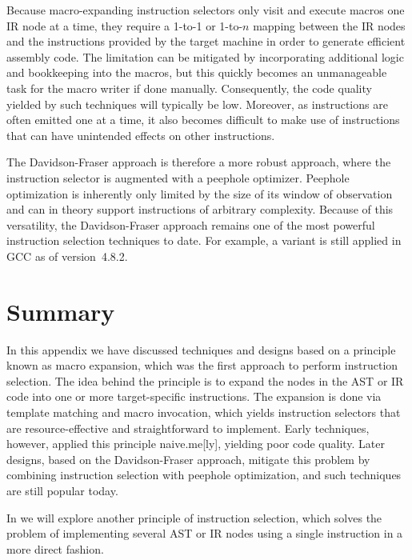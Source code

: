 Because \gls{macro}-expanding \glspl{instruction selector} only visit and
execute \glspl{macro} one \gls{IR} \gls{node} at a time, they require a
\mbox{1-to-1} or \mbox{1-to-$n$} mapping between the \gls{IR} \glspl{node} and
the \glspl{instruction} provided by the \gls{target machine} in order to
generate efficient \gls{assembly code}.
%
The limitation can be mitigated by incorporating additional logic and
bookkeeping into the \glspl{macro}, but this quickly becomes an unmanageable
task for the \gls{macro} writer if done manually.
%
Consequently, the code quality yielded by such techniques will typically be low.
%
Moreover, as \glspl{instruction} are often emitted one at a time, it also
becomes difficult to make use of \glspl{instruction} that can have unintended
effects on other \glspl{instruction}.

The \gls{Davidson-Fraser approach} is therefore a more robust approach, where
the \gls{instruction selector} is augmented with a \gls{peephole optimizer}.
%
\Gls{Peephole optimization} is inherently only limited by the size of its window
of observation and can in theory support \glspl{instruction} of arbitrary
complexity.
%
Because of this versatility, the \gls{Davidson-Fraser approach} remains one of
the most powerful \gls{instruction selection} techniques to date.
%
For example, a variant is still applied in \gls{GCC} as of version~4.8.2.


\section{Summary}

In this appendix we have discussed techniques and designs based on a
\gls{principle} known as \gls{macro expansion}, which was the first approach to
perform \gls{instruction selection}.
%
The idea behind the \gls{principle} is to expand the \glspl{node} in the
\gls{AST} or \gls{IR} code into one or more target-specific \glspl{instruction}.
%
The expansion is done via \gls{template} matching and \gls{macro} invocation,
which yields \glspl{instruction selector} that are resource-effective and
straightforward to implement.
%
Early techniques, however, applied this principle \gls{naive.me}[ly], yielding
poor code quality.
%
Later designs, based on the \gls{Davidson-Fraser approach}, mitigate this
problem by combining \gls{instruction selection} with \gls{peephole
  optimization}, and such techniques are still popular today.

In  we will explore another \gls{principle} of
\gls{instruction selection}, which solves the problem of implementing several
\gls{AST} or \gls{IR} \glspl{node} using a single \gls{instruction} in a more
direct fashion.
